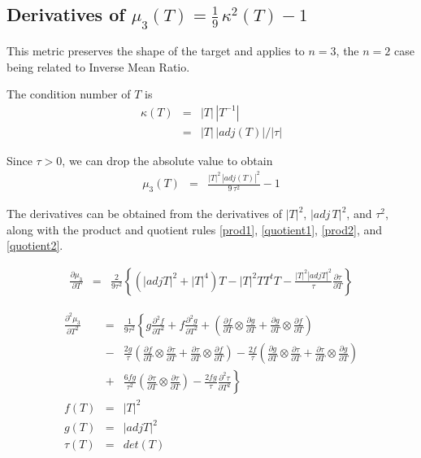 \documentclass{report}
\begin{document}
\subsection{Derivatives of $\mu_3(T)=\frac{1}{9} \, \kappa^2(T) - 1$ \label{s+1} }

\noindent This metric preserves the shape of the target and applies
to $n=3$, the $n=2$ case being related to Inverse Mean Ratio. \newline

\noindent The condition number of $T$ is
\begin{eqnarray}
\kappa(T) & = & |T| \, |T^{-1}| \\
          & = & |T| \, |adj(T)| / |\tau|
\end{eqnarray}

\noindent Since $\tau>0$, we can drop the absolute value to obtain
\begin{eqnarray}
\mu_3(T) & = & \frac{|T|^2 \, |adj(T)|^2}{9 \, \tau^2} - 1
\end{eqnarray}

\noindent The derivatives can be obtained from the derivatives of $|T|^2$,
$|adj \, T|^2$, and $\tau^2$, along with the product and quotient rules 
\ref{prod1}, \ref{quotient1}, \ref{prod2}, and \ref{quotient2}. \newline 

\begin{eqnarray}
\frac{ \partial \mu_3 }{ \partial T } & = & \frac{2}{ 9 \tau^2 } \left\{ \left( |adj T|^2 + |T|^4 \right) T - |T|^2 T T^t T - \frac{ |T|^2 |adj T|^2 }{\tau} \frac{\partial \tau}{\partial T} \right\} 
\end{eqnarray}

\begin{eqnarray}
\nonumber
\frac{\partial^2 \mu_3}{\partial T^2} &=& \frac{1}{9 \tau^2} \left\{
   g \frac{\partial^2 f}{\partial T^2} + 
   f \frac{\partial^2 g}{\partial T^2} + 
   \left( \frac{\partial f}{\partial T} \otimes \frac{\partial g}{\partial T} + 
           \frac{\partial g}{\partial T} \otimes \frac{\partial f}{\partial T} \right) \right. \\
 \nonumber
 &-& \frac{2 g}{\tau} \left( \frac{\partial f}{\partial T} \otimes \frac{\partial \tau}{\partial T} + 
           \frac{\partial \tau}{\partial T} \otimes \frac{\partial f}{\partial T} \right) -
    \frac{2 f}{\tau} \left( \frac{\partial g}{\partial T} \otimes \frac{\partial \tau}{\partial T} + 
           \frac{\partial \tau}{\partial T} \otimes \frac{\partial g}{\partial T} \right) \\
 &+& \left. \frac{6 f g}{\tau^2} \left( \frac{\partial \tau}{\partial T} \otimes \frac{\partial \tau}{\partial T} \right) -
    \frac{2 f g}{\tau} \frac{\partial^2 \tau}{\partial T^2} \right\} \\
\nonumber f(T) &=& |T|^2 \\
\nonumber g(T) &=& |adj T|^2 \\
\nonumber \tau(T) &=& det(T)
\end{eqnarray}
\end{document}
